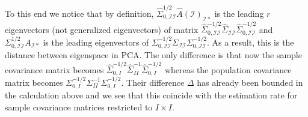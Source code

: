 \documentclass[11pt]{article}
\newcommand{\AI}{\widehat{A}(\cI)}
\newcommand{\cI}{{\mathcal{I}}}
\newcommand{\0}{{\mathbf{0}}}
\newcommand{\op}{{\mathrm{op}}}
\begin{document}
To this end we notice that by definition, $\widehat{\Sigma}_{0,\cI\cI}^{1/2}\AI_{\cI*}$ is the leading $r$ eigenvectors (not generalized eigenvectors) of matrix $\widehat{\Sigma}_{0,\cI\cI}^{-1/2}\widehat{\Sigma}_{\cI\cI}\widehat{\Sigma}_{0,\cI\cI}^{-1/2}$ and $\Sigma_{0,\cI\cI}^{1/2}A_{\cI*}$ is the leading eigenvectors of $\Sigma_{0,\cI\cI}^{-1/2}\Sigma_{\cI\cI}\Sigma_{0,\cI\cI}^{-1/2}$.
As a result, this is the distance between eigenspace in PCA. 
 \iffalse The only difference is that now the sample covariance matrix becomes $\widehat{\Sigma}_{0,I}^{-1/2}\widehat{\Sigma}_{II}^{-1}\widehat{\Sigma}_{0,I}^{-1/2}$ whereas the population covariance matrix becomes $\Sigma_{0,I}^{-1/2}\Sigma_{II}^{-1}\Sigma_{0,I}^{-1/2}$. Their difference $\Delta$ has already been bounded in the calculation above and we see that this coincide with the estimation rate for sample covariance matrices restricted to $I\times I$.
\end{document}
